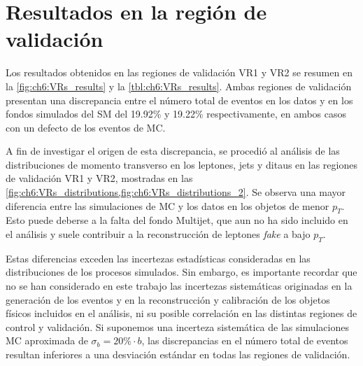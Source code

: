 \section{Resultados en la región de validación}

Los resultados obtenidos en las regiones de validación VR1 y VR2 se resumen en la \cref{fig:ch6:VRs_results} y la \cref{tbl:ch6:VRs_results}. Ambas regiones de validación presentan una discrepancia entre el número total de eventos en los datos y en los fondos simulados del SM del 19.92\% y 19.22\% respectivamente, en ambos casos con un defecto de los eventos de MC.

A fin de investigar el origen de esta discrepancia, se procedió al análisis de las distribuciones de momento transverso en los leptones, jets y ditaus en las regiones de validación VR1 y VR2, mostradas en las \cref{fig:ch6:VRs_distributions,fig:ch6:VRs_distributions_2}. Se observa una mayor diferencia entre las simulaciones de MC y los datos en los objetos de menor $p_T$. Esto puede deberse a la falta del fondo Multijet, que aun no ha sido incluido en el análisis y suele contribuir a la reconstrucción de leptones \textit{fake} a bajo $p_T$.

Estas diferencias exceden las incertezas estadísticas consideradas en las distribuciones de los procesos simulados. Sin embargo, es importante recordar que no se han considerado en este trabajo las incertezas sistemáticas originadas en la generación de los eventos y en la reconstrucción y calibración de los objetos físicos incluidos en el análisis, ni su posible correlación en las distintas regiones de control y validación. Si suponemos una incerteza sistemática de las simulaciones MC aproximada de $\sigma_b = 20\% \cdot b$, las discrepancias en el número total de eventos resultan inferiores a una desviación estándar en todas las regiones de validación.




